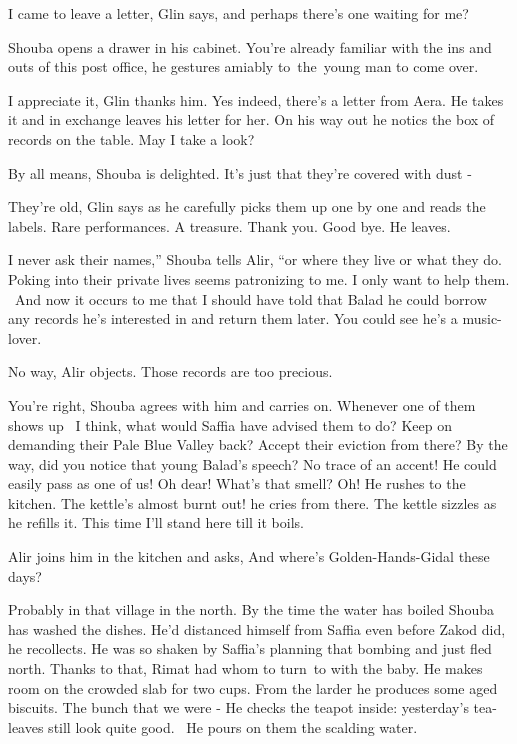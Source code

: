 \documentclass[12pt]{book}
\begin{document}
{\textquotedbl}I came to leave a letter,{\textquotedbl} Glin says, {\textquotedbl}and perhaps there's one waiting for
me?{\textquotedbl}

Shouba opens a drawer in his cabinet. {\textquotedbl}You're already familiar with the ins and outs of this post
office,{\textquotedbl} he gestures amiably to~the~young man to come over.

{\textquotedbl}I appreciate it,{\textquotedbl} Glin thanks him. Yes indeed, there's a letter from Aera. He takes it and
in exchange leaves his letter for her. On his way out he notics the box of records on the table. {\textquotedbl}May I
take a look?{\textquotedbl}

{\textquotedbl}By all means,{\textquotedbl} Shouba is delighted. {\textquotedbl}It's just that they're covered with dust
-{\textquotedbl}

{\textquotedbl}They're old,{\textquotedbl} Glin says as he carefully picks them up one by one and reads the labels.
{\textquotedbl}Rare performances. A treasure. Thank you. Good bye.{\textquotedbl} He leaves.

{\textquotedbl}I never ask their names,'' Shouba tells Alir, ``or where they live or what they do. Poking into their
private lives seems patronizing to me. I only want to help them. ~And now it occurs to me that I should have told that
Balad he could borrow any records he's interested in and return them later. You could see he's a
music-lover.{\textquotedbl}

{\textquotedbl}No way,{\textquotedbl} Alir objects. {\textquotedbl}Those records are too precious.{\textquotedbl}

{\textquotedbl}You're right,{\textquotedbl} Shouba agrees with him and carries on. {\textquotedbl}Whenever one of them
shows up \ I think, what would Saffia have advised them to do? Keep on demanding their Pale Blue Valley back? Accept
their eviction from there? By the way, did you notice that young Balad's speech? No trace of an accent! He could easily
pass as one of us! Oh dear! What's that smell? Oh!{\textquotedbl} He rushes to the kitchen. {\textquotedbl}The kettle's
almost burnt out!{\textquotedbl} he cries from there. The kettle sizzles as he refills it. {\textquotedbl}This time
I'll stand here till it boils.{\textquotedbl}

Alir joins him in the kitchen and asks, {\textquotedbl}And where's Golden-Hands-Gidal these days?{\textquotedbl}

{\textquotedbl}Probably in that village in the north.{\textquotedbl} By the time the water has boiled Shouba has washed
the dishes. {\textquotedbl}He'd distanced himself from Saffia even before Zakod did,{\textquotedbl} he recollects.
{\textquotedbl}He was so shaken by Saffia's planning that bombing and just fled north. Thanks to that, Rimat had whom
to turn~to with the baby.{\textquotedbl} He makes room on the crowded slab for two cups. From the larder he produces
some aged biscuits. {\textquotedbl}The bunch that we were -{\textquotedbl} He checks the teapot inside: yesterday's
tea-leaves still look quite good. ~He pours on them the scalding water.
\end{document}
